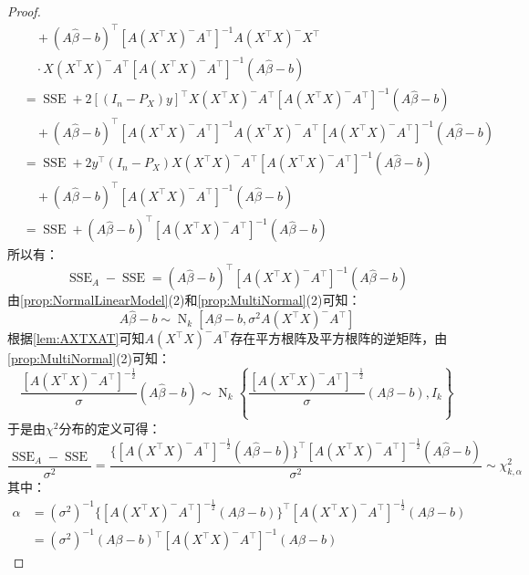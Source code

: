 \begin{proof}
\begin{align*}
		&\quad+(A\hat{\beta}-b)^{\top}[A(X^{\top}X)^-A^{\top}]^{-1}A(X^{\top}X)^-X^{\top} \\
		&\quad\cdot X(X^{\top}X)^-A^{\top}[A(X^{\top}X)^-A^{\top}]^{-1}(A\hat{\beta}-b) \\
		&=\operatorname{SSE}+2[(I_n-P_X)y]^{\top}X(X^{\top}X)^-A^{\top}[A(X^{\top}X)^-A^{\top}]^{-1}(A\hat{\beta}-b) \\
		&\quad+(A\hat{\beta}-b)^{\top}[A(X^{\top}X)^-A^{\top}]^{-1}A(X^{\top}X)^-A^{\top}[A(X^{\top}X)^-A^{\top}]^{-1}(A\hat{\beta}-b) \\
		&=\operatorname{SSE}+2y^{\top}(I_n-P_X)X(X^{\top}X)^-A^{\top}[A(X^{\top}X)^-A^{\top}]^{-1}(A\hat{\beta}-b) \\
		&\quad+(A\hat{\beta}-b)^{\top}[A(X^{\top}X)^-A^{\top}]^{-1}(A\hat{\beta}-b) \\
		&=\operatorname{SSE}+(A\hat{\beta}-b)^{\top}[A(X^{\top}X)^-A^{\top}]^{-1}(A\hat{\beta}-b)
	\end{align*}
	所以有：
	\begin{equation*}
		\operatorname{SSE}_A-\operatorname{SSE}=(A\hat{\beta}-b)^{\top}[A(X^{\top}X)^-A^{\top}]^{-1}(A\hat{\beta}-b)
	\end{equation*}
	由\cref{prop:NormalLinearModel}(2)和\cref{prop:MultiNormal}(2)可知：
	\begin{equation*}
		A\hat{\beta}-b\sim\operatorname{N}_k[A\beta-b,\sigma^2A(X^{\top}X)^-A^{\top}]
	\end{equation*}
	根据\cref{lem:AXTXAT}可知$A(X^{\top}X)^-A^{\top}$存在平方根阵及平方根阵的逆矩阵，由\cref{prop:MultiNormal}(2)可知：
	\begin{equation*}
		\frac{[A(X^{\top}X)^-A^{\top}]^{-\frac{1}{2}}}{\sigma}(A\hat{\beta}-b)\sim\operatorname{N}_k\left\{\frac{[A(X^{\top}X)^-A^{\top}]^{-\frac{1}{2}}}{\sigma}(A\beta-b),I_k\right\}
	\end{equation*}
	于是由$\chi^2$分布的定义可得：
	\begin{equation*}
		\frac{\operatorname{SSE}_A-\operatorname{SSE}}{\sigma^2}=\frac{\{[A(X^{\top}X)^-A^{\top}]^{-\frac{1}{2}}(A\hat{\beta}-b)\}^{\top}[A(X^{\top}X)^-A^{\top}]^{-\frac{1}{2}}(A\hat{\beta}-b)}{\sigma^2}\sim\chi_{k,\alpha}^2
	\end{equation*}
	其中：
	\begin{align*}
		\alpha&=(\sigma^2)^{-1}\{[A(X^{\top}X)^-A^{\top}]^{-\frac{1}{2}}(A\beta-b)\}^{\top}[A(X^{\top}X)^-A^{\top}]^{-\frac{1}{2}}(A\beta-b) \\
		&=(\sigma^2)^{-1}(A\beta-b)^{\top}[A(X^{\top}X)^-A^{\top}]^{-1}(A\beta-b)
	\end{align*}\par

\end{proof}
